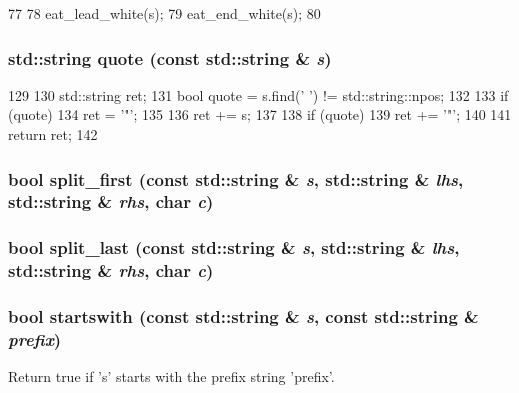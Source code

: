 \begin{DoxyCode}
77 {
78     eat_lead_white(s);
79     eat_end_white(s);
80 }
\end{DoxyCode}
\hypertarget{str_8hh_adf03d3b3ac6621980b69277e795fa55b}{
\subsubsection[{quote}]{\setlength{\rightskip}{0pt plus 5cm}std::string quote (const std::string \& {\em s})}}
\label{str_8hh_adf03d3b3ac6621980b69277e795fa55b}



\begin{DoxyCode}
129 {
130     std::string ret;
131     bool quote = s.find(' ') != std::string::npos;
132 
133     if (quote)
134         ret = '"';
135 
136     ret += s;
137 
138     if (quote)
139         ret += '"';
140 
141     return ret;
142 }
\end{DoxyCode}
\hypertarget{str_8hh_a5f91fe9e528c171c7df654465e085fa5}{
\subsubsection[{split\_\-first}]{\setlength{\rightskip}{0pt plus 5cm}bool split\_\-first (const std::string \& {\em s}, \/  std::string \& {\em lhs}, \/  std::string \& {\em rhs}, \/  char {\em c})}}
\label{str_8hh_a5f91fe9e528c171c7df654465e085fa5}
\hypertarget{str_8hh_a710d749c1d6bedb9dae961a945f24cb0}{
\subsubsection[{split\_\-last}]{\setlength{\rightskip}{0pt plus 5cm}bool split\_\-last (const std::string \& {\em s}, \/  std::string \& {\em lhs}, \/  std::string \& {\em rhs}, \/  char {\em c})}}
\label{str_8hh_a710d749c1d6bedb9dae961a945f24cb0}
\hypertarget{str_8hh_a2c644cc2d600fe809a4fe1497ebe135a}{
\subsubsection[{startswith}]{\setlength{\rightskip}{0pt plus 5cm}bool startswith (const std::string \& {\em s}, \/  const std::string \& {\em prefix})}}
\label{str_8hh_a2c644cc2d600fe809a4fe1497ebe135a}
Return true if 's' starts with the prefix string 'prefix'. 


